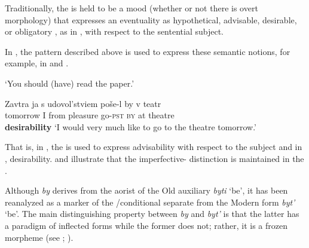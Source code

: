 \documentclass[output=paper,modfonts,newtxmath,hidelinks,]{langscibook}
\begin{document}
\noindent Traditionally, the  is held to be a mood (whether or not there is overt morphology) that expresses an eventuality as hypothetical, advisable, desirable, or obligatory \citep[142]{HarrisonLeFleming2000}, as in , with respect to the sentential subject.\largerpage[-1]

\ea \label{10:ex7}
    \hfill \citep[142]{HarrisonLeFleming2000}
	\z
\z

\noindent In , the  pattern described above is used to express these semantic notions, for example, in  and .

\ea \label{10:ex8}
	\z
        \glt `You should (have) read the paper.'\hfill\citep[142]{HarrisonLeFleming2000}
\z

\ea \label{10:ex9}
\gll Zavtra ja s udovol’stviem poše-l by v teatr\\
     tomorrow I from pleasure go\textsc{-pst} \textsc{by} at theatre\\\hfill\textbf{desirability}
\glt `I would very much like to go to the theatre tomorrow.'
\z

\noindent That is, in , the  is used to express advisability with respect to the subject and in , desirability.  and  illustrate that the imperfective- distinction is maintained in the .

Although \textit{by} derives from the aorist of the Old  auxiliary \textit{byti} ‘be’, it has been reanalyzed as a marker of the /conditional separate from the Modern  form \textit{byt’} ‘be’. The main distinguishing property between \textit{by} and \textit{byt’} is that the latter has a paradigm of inflected forms while the former does not; rather, it is a frozen morpheme (see \citealt{Spencer2001}; \citealt{Mezhevich2006}).
\end{document}
